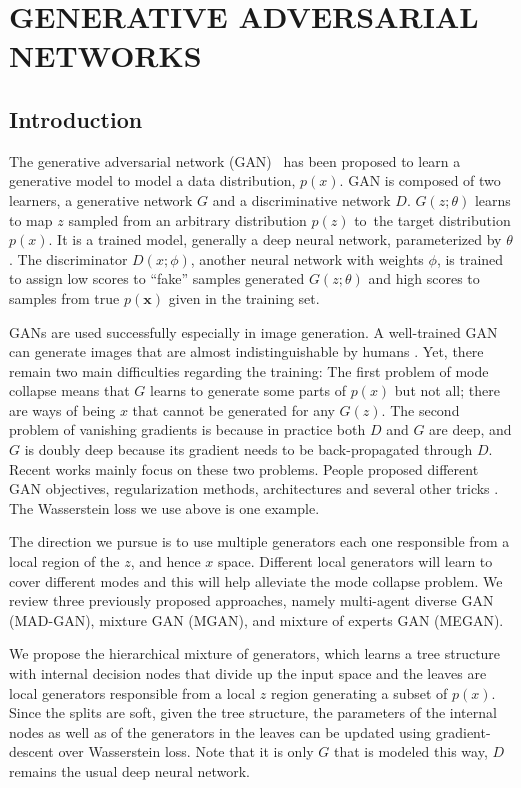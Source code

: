 \documentclass[a4paper,onesided,12pt]{report}
\begin{document}
\chapter{GENERATIVE ADVERSARIAL NETWORKS}
\label{chapter:gan}

\section{Introduction}
\label{sec:gan:intro}

The generative adversarial network (GAN) \cite{gan}~has been proposed to learn a generative model to model a data distribution, $p(x)$. GAN is composed of two learners, a generative network $G$ and a discriminative network $D$. $G(z;\theta)$ learns to map $z$ sampled from an arbitrary distribution $p(z)$ to~the target distribution $p(x)$. It is a trained model, generally a deep neural network, parameterized by $\theta$. The discriminator $D(x;\phi)$, another neural network with weights $\phi$, is trained to assign low scores to ``fake'' samples generated $G(z;\theta)$ and high scores to samples from true $p(\boldsymbol{x})$ given in the training set.

GANs are used successfully especially in image generation. A well-trained GAN can generate images that are almost indistinguishable by humans \cite{stylegan}. Yet, there remain two main difficulties regarding the training: The first problem of mode collapse means that $G$ learns to generate some parts of $p(x)$ but not all; there are ways of being $x$ that cannot be generated for any $G(z)$. The second problem of vanishing gradients is because in practice both $D$ and $G$ are deep, and $G$ is doubly deep because its gradient needs to be back-propagated through $D$. Recent works mainly focus on these two problems. People proposed different GAN objectives, regularization methods, architectures and several other tricks \cite{ganreview}. The Wasserstein loss we use above is one example. 

The direction we pursue is to use multiple generators each one responsible from a local region of the $z$, and hence $x$ space. Different local generators will learn to cover different modes and this will help alleviate the mode collapse problem. We review three previously proposed approaches, namely multi-agent diverse GAN (MAD-GAN)\cite{madgan}, mixture GAN (MGAN)\cite{mgan}, and mixture of experts GAN (MEGAN)\cite{megan}. 

We propose the hierarchical mixture of generators, which learns a tree structure with internal decision nodes that divide up the input space and the leaves are local generators responsible from a local $z$ region generating a subset of $p(x)$. Since the splits are soft, given the tree structure, the parameters of the internal nodes as well as of the generators in the leaves can be updated using gradient-descent over Wasserstein loss. Note that it is only $G$ that is modeled this way, $D$ remains the usual deep neural network.
\end{document}
